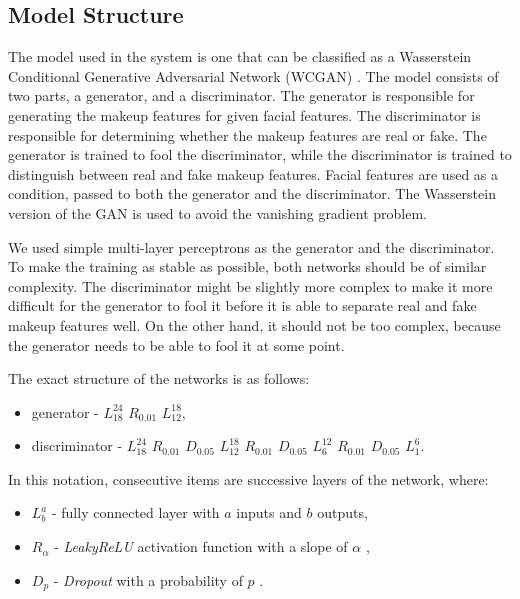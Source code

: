 \documentclass[conference]{IEEEtran}
\begin{document}
\subsection{Model Structure}

The model used in the system is one that can be classified as a Wasserstein Conditional Generative Adversarial Network (WCGAN) \cite{arjovsky2017wasserstein}.
The model consists of two parts, a generator, and a discriminator.
The generator is responsible for generating the makeup features for given facial features.
The discriminator is responsible for determining whether the makeup features are real or fake.
The generator is trained to fool the discriminator, while the discriminator is trained to distinguish between real and fake makeup features.
Facial features are used as a condition, passed to both the generator and the discriminator.
The Wasserstein version of the GAN is used to avoid the vanishing gradient problem.

We used simple multi-layer perceptrons as the generator and the discriminator.
To make the training as stable as possible, both networks should be of similar complexity.
The discriminator might be slightly more complex to make it more difficult for the generator to fool it before it is able to separate real and fake makeup features well.
On the other hand, it should not be too complex, because the generator needs to be able to fool it at some point.

The exact structure of the networks is as follows:

\begin{itemize}
    \item generator - $L^{24}_{18}$ $R_{0.01}$ $L^{18}_{12}$,
    \item discriminator - $L^{24}_{18}$ $R_{0.01}$ $D_{0.05}$ $L^{18}_{12}$ $R_{0.01}$ $D_{0.05}$ $L^{12}_{6}$ $R_{0.01}$ $D_{0.05}$ $L^{6}_{1}$.
\end{itemize}

In this notation, consecutive items are successive layers of the network, where:

\begin{itemize}
    \item $L^{a}_{b}$ - fully connected layer with $a$ inputs and $b$ outputs,
    \item $R_{\alpha}$ - \emph{LeakyReLU} activation function with a slope of $\alpha$ \cite{maas13relu},
    \item $D_{p}$ - \emph{Dropout} with a probability of $p$ \cite{dropout}.
\end{itemize}
\end{document}

